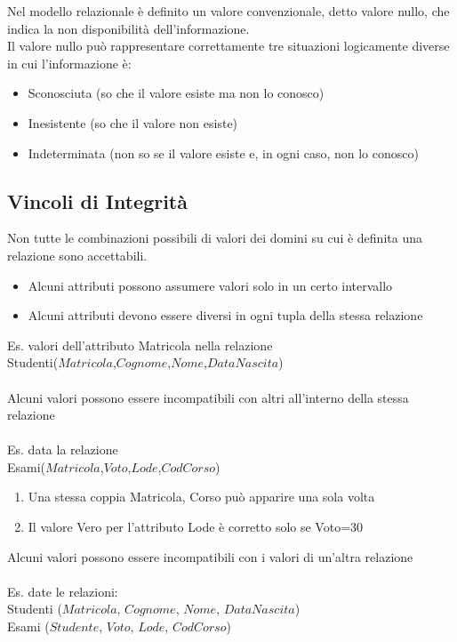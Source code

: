\documentclass[../main.tex]{subfiles}
\begin{document}
	Nel modello relazionale è definito un valore convenzionale, detto valore nullo, che indica la non disponibilità dell’informazione.\\
	Il valore nullo può rappresentare correttamente tre situazioni logicamente diverse in cui l’informazione è:
	\begin{itemize}
		\item Sconosciuta (so che il valore esiste ma non lo conosco)
		\item Inesistente (so che il valore non esiste)
		\item Indeterminata (non so se il valore esiste e, in ogni caso, non lo conosco)
	\end{itemize}
	\subsection{Vincoli di Integrità}
	Non tutte le combinazioni possibili di valori dei domini su cui è definita una relazione sono accettabili.
	\begin{itemize}
		\item Alcuni attributi possono assumere valori solo in un certo intervallo
		\item Alcuni attributi devono essere diversi in ogni tupla della stessa relazione
	\end{itemize}
	Es. valori dell’attributo Matricola nella relazione\\
	Studenti($Matricola$,$Cognome$,$Nome$,$DataNascita$)\\ \\
	Alcuni valori possono essere incompatibili con altri all’interno della stessa relazione\\ \\
	Es. data la relazione \\
	Esami($Matricola$,$Voto$,$Lode$,$CodCorso$)
	\begin{enumerate}
		\item Una stessa coppia Matricola, Corso può apparire una sola volta
		\item Il valore Vero per l’attributo Lode è corretto solo se Voto=30
	\end{enumerate}
	Alcuni valori possono essere incompatibili con i valori di un’altra relazione\\ \\
	Es. date le relazioni:\\
	Studenti ($Matricola$, $Cognome$, $Nome$, $DataNascita$)\\
	Esami ($Studente$, $Voto$, $Lode$, $CodCorso$)\\
\end{document}
